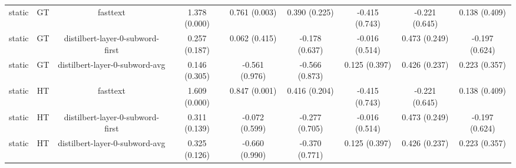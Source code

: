 \begin{sidewaystable}[htb]
\begin{tabular}{@{}ccccccccc@{}}
        static & GT & fasttext & 1.378 (0.000) & 0.761 (0.003) & 0.390 (0.225) & -0.415 (0.743) & -0.221 (0.645) & 0.138 (0.409) \\
        static & GT & distilbert-layer-0-subword-first & 0.257 (0.187) & 0.062 (0.415) & -0.178 (0.637) & -0.016 (0.514) & 0.473 (0.249) & -0.197 (0.624) \\
        static & GT & distilbert-layer-0-subword-avg & 0.146 (0.305) & -0.561 (0.976) & -0.566 (0.873) & 0.125 (0.397) & 0.426 (0.237) & 0.223 (0.357) \\
        static & HT & fasttext & 1.609 (0.000) & 0.847 (0.001) & 0.416 (0.204) & -0.415 (0.743) & -0.221 (0.645) & 0.138 (0.409) \\
        static & HT & distilbert-layer-0-subword-first & 0.311 (0.139) & -0.072 (0.599) & -0.277 (0.705) & -0.016 (0.514) & 0.473 (0.249) & -0.197 (0.624) \\
        static & HT & distilbert-layer-0-subword-avg & 0.325 (0.126) & -0.660 (0.990) & -0.370 (0.771) & 0.125 (0.397) & 0.426 (0.237) & 0.223 (0.357) \\
        \bottomrule
    \end{tabular}
\end{sidewaystable}
